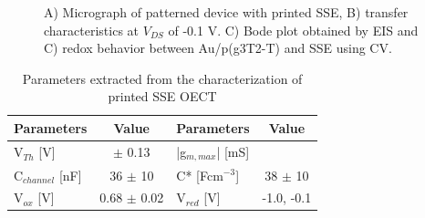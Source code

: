 \begin{figure}[ht]
    \centering
    \qquad
    \caption[Performance of solid-OECT with printed SSE]{A) Micrograph of patterned device with printed SSE, B) transfer characteristics at $V_{DS}$ of -0.1 V. C) Bode plot obtained by EIS and C) redox behavior between Au/p(g3T2-T) and SSE using CV.}
    \label{fig:printedSSE}
\end{figure}

\begin{table}[ht]
\centering
\caption{Parameters extracted from the characterization of printed SSE OECT}
\begin{tabular}{l|c||l|c}
Parameters & Value & Parameters & Value \\\hline \hline
V$_{Th}$ [V] &  $\pm$ 0.13 & |g$_{m,max}$| [mS] & \\
C$_{channel}$ [nF] & 36 $\pm$ 10 & C* [Fcm$^{-3}$] & 38 $\pm$ 10 \\
V$_{ox}$ [V] & 0.68 $\pm$ 0.02 & V$_{red}$ [V] & -1.0, -0.1 \\\hline
\end{tabular}
\label{tab:printedfom}
\end{table}

